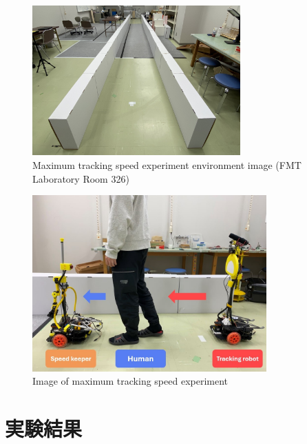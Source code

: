 \begin{figure}[h]
  \begin{center}
  \includegraphics[width=80mm,clip]{figure/experimental_env3.JPG}
  \caption{Maximum tracking speed experiment environment image (FMT Laboratory Room 326)}
  \label{Maximum tracking speed experiment environment image (FMT Laboratory Room 326)}
  \end{center}
\end{figure}

\begin{figure}[h]
  \begin{center}
  \includegraphics[width=90mm,clip]{figure/max_experiment_image.JPG}
  \caption{Image of maximum tracking speed experiment}
  \label{Image of maximum tracking speed experiment}
  \end{center}
\end{figure}

\clearpage

\section{実験結果}
